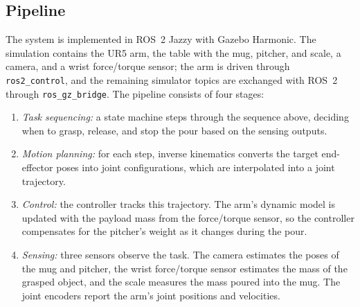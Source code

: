 \documentclass[conference]{IEEEtran}
\begin{document}
\subsection{Pipeline}
The system is implemented in ROS~2 Jazzy with Gazebo Harmonic. The
simulation contains the UR5 arm, the table with the mug, pitcher, and
scale, a camera, and a wrist force/torque sensor; the arm is driven through
\texttt{ros2\_control}, and the remaining simulator topics are exchanged
with ROS~2 through \texttt{ros\_gz\_bridge}. The pipeline consists of four
stages:
\begin{enumerate}
    \item \textit{Task sequencing:} a state machine steps through the
            sequence above, deciding when to grasp, release, and stop the pour
            based on the sensing outputs.
    \item \textit{Motion planning:} for each step, inverse kinematics
            converts the target end-effector poses into joint configurations,
            which are interpolated into a joint trajectory.
    \item \textit{Control:} the controller tracks this trajectory. 
            The arm's dynamic model is updated with
            the payload mass from the force/torque sensor, so the
            controller compensates for the pitcher's weight as it changes
            during the pour.
    \item \textit{Sensing:} three sensors observe the task. The camera
            estimates the poses of the mug and pitcher, the wrist
            force/torque sensor estimates the mass of the grasped object,
            and the scale measures the mass poured into the mug. The joint
            encoders report the arm's joint positions and velocities.
\end{enumerate}
\end{document}
